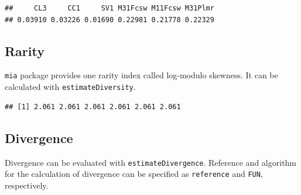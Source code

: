 \documentclass[
]{book}
\newenvironment{Shaded}{\begin{snugshade}}{\end{snugshade}}
\newcommand{\AttributeTok}[1]{\textcolor[rgb]{0.77,0.63,0.00}{#1}}
\newcommand{\FunctionTok}[1]{\textcolor[rgb]{0.00,0.00,0.00}{#1}}
\newcommand{\NormalTok}[1]{#1}
\newcommand{\OtherTok}[1]{\textcolor[rgb]{0.56,0.35,0.01}{#1}}
\newcommand{\SpecialCharTok}[1]{\textcolor[rgb]{0.00,0.00,0.00}{#1}}
\newcommand{\StringTok}[1]{\textcolor[rgb]{0.31,0.60,0.02}{#1}}
\begin{document}
\begin{Shaded}
\end{Shaded}

\begin{verbatim}
##     CL3     CC1     SV1 M31Fcsw M11Fcsw M31Plmr 
## 0.03910 0.03226 0.01690 0.22981 0.21778 0.22329
\end{verbatim}

\hypertarget{rarity}{%
\subsection{Rarity}\label{rarity}}

\texttt{mia} package provides one rarity index called log-modulo skewness. It can be
calculated with \texttt{estimateDiversity}.

\begin{Shaded}
\end{Shaded}

\begin{verbatim}
## [1] 2.061 2.061 2.061 2.061 2.061 2.061
\end{verbatim}

\hypertarget{divergence}{%
\subsection{Divergence}\label{divergence}}

Divergence can be evaluated with \texttt{estimateDivergence}. Reference and algorithm for the calculation of divergence can be specified as \texttt{reference} and \texttt{FUN}, respectively.
\end{document}
